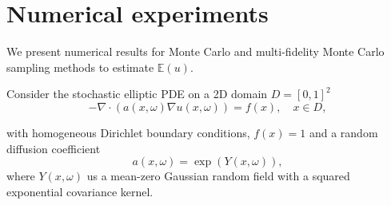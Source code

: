 \section{Numerical experiments}\label{sec:Num-Exp}
%
We present numerical results for Monte Carlo and multi-fidelity Monte Carlo sampling methods to estimate $\mathbb{E}(u)$. 



Consider the stochastic elliptic PDE on a 2D domain $D=[0,1]^2$
\[
-\nabla\cdot \left(a(x,\omega)\nabla u(x,\omega)\right) =f(x), \quad x\in D,
\]

with homogeneous Dirichlet boundary conditions, $f(x)=1$ and a random diffusion coefficient
\[
a(x,\omega) = \exp \left(Y(x,\omega)\right),
\]
where $Y(x,\omega)$ us a mean-zero Gaussian random field with a squared exponential covariance kernel.







 














   

















